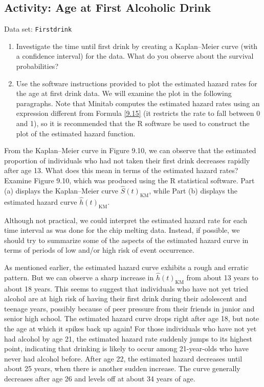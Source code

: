 \documentclass[
]{book}
\begin{document}
\hypertarget{activity-age-at-first-alcoholic-drink}{%
\subsection*{Activity: Age at First Alcoholic Drink}\label{activity-age-at-first-alcoholic-drink}}

Data set: \texttt{Firstdrink}

\begin{enumerate}
\def\labelenumi{\arabic{enumi}.}
\setcounter{enumi}{42}
\item
  Investigate the time until first drink by creating a Kaplan--Meier curve (with a confidence interval) for the data. What do you observe about the survival probabilities?
\item
  Use the software instructions provided to plot the estimated hazard rates for the age at first drink data. We will examine the plot in the following paragraphs. Note that Minitab computes the estimated hazard rates using an expression different from Formula \ref{9.15} (it restricts the rate to fall between 0 and 1), so it is recommended that the R software be used to construct the plot of the estimated hazard function.
\end{enumerate}

From the Kaplan--Meier curve in Figure 9.10, we can observe that the estimated proportion of individuals who had not taken their first drink decreases rapidly after age 13. What does this mean in terms of the estimated hazard rates? Examine Figure 9.10, which was produced using the R statistical software. Part (a) displays the Kaplan--Meier curve \(\hat S(t)_{\mathrm{KM}}\), while Part (b) displays the estimated hazard curve \(\hat h(t)_{\mathrm{KM}}\).

Although not practical, we could interpret the estimated hazard rate for each time interval as was done for
the chip melting data. Instead, if possible, we should try to summarize some of the aspects of the estimated
hazard curve in terms of periods of low and/or high risk of event occurrence.

As mentioned earlier, the estimated hazard curve exhibits a rough and erratic pattern. But we can observe
a sharp increase in \(\hat h(t)_{\mathrm{KM}}\) from about 13 years to about 18 years. This seems to suggest that individuals who have not yet tried alcohol are at high risk of having their first drink during their adolescent and teenage years,
possibly because of peer pressure from their friends in junior and senior high school. The estimated hazard
curve drops right after age 18, but note the age at which it spikes back up again! For those individuals who
have not yet had alcohol by age 21, the estimated hazard rate suddenly jumps to its highest point, indicating
that drinking is likely to occur among 21-year-olds who have never had alcohol before. After age 22, the
estimated hazard decreases until about 25 years, when there is another sudden increase. The curve generally
decreases after age 26 and levels off at about 34 years of age.
\end{document}
